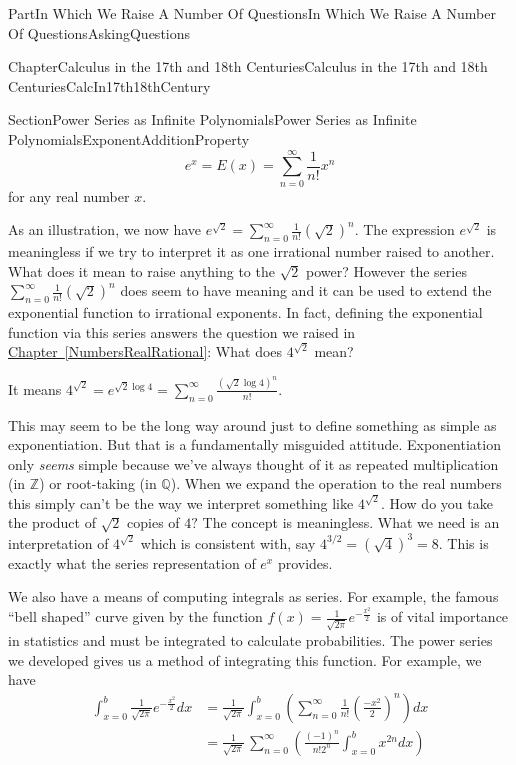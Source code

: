 \documentclass[oneside,10pt,]{book}
\newcommand{\xreffont}{\relax}
\numberwithin{equation}{part}
\newcommand{\QQ}{\mathbb {Q}}
\newcommand{\ZZ}{\mathbb {Z}}
\newcommand{\amp}{&}
\begin{document}
\begin{partptx}{Part}{In Which We Raise A Number Of Questions}{}{In Which We Raise A Number Of Questions}{}{}{AskingQuestions}
\begin{chapterptx}{Chapter}{Calculus in the 17th and 18th Centuries}{}{Calculus in the 17th and 18th Centuries}{}{}{CalcIn17th18thCentury}
\begin{sectionptx}{Section}{Power Series as Infinite Polynomials}{}{Power Series as Infinite Polynomials}{}{}{ExponentAdditionProperty}
\begin{equation*}
e^x=E(x)=\sum_{n=0}^\infty\frac{1}{n!}x^n
\end{equation*}
for any real number \(x\).%
\par
As an illustration, we now have \(e^{\sqrt{2}}=\sum_{n=0}^\infty\frac{1}{n!}\left(\sqrt{2}\right)^n\). The expression \(e^{\sqrt{2}}\) is meaningless if we try to interpret it as one irrational number raised to another. What does it mean to raise anything to the \(\sqrt{2}\) power?  However the series \(\sum_{n=0}^\infty\frac{1}{n!}\left(\sqrt{2}\right)^n\) does seem to have meaning and it can be used to extend the exponential function to irrational exponents.  In fact, defining the exponential function via this series answers the question we raised in \hyperref[NumbersRealRational]{Chapter~{\xreffont\ref{NumbersRealRational}}}: What does \(4^{\sqrt{2}}\) mean?%
\par
It means \(\displaystyle 4^{\sqrt{2}} = e^{\sqrt{2}\log 4}
= \sum_{n=0}^\infty\frac{(\sqrt{2}\log 4)^n}{n!}\).%
\par
This may seem to be the long way around just to define something as simple as exponentiation.  But that is a fundamentally misguided attitude.  Exponentiation only \emph{seems} simple because we've always thought of it as repeated multiplication (in \(\ZZ\)) or root-taking (in \(\QQ\)).  When we expand the operation to the real numbers this simply can't be the way we interpret something like \(4^{\sqrt{2}}\).  How do you take the product of \(\sqrt{2}\) copies of \(4?\) The concept is meaningless.  What we need is an interpretation of \(4^{\sqrt{2}}\) which is consistent with, say \(4^{3/2}
= \left(\sqrt{4}\right)^3=8\).  This is exactly what the series representation of \(e^x\) provides.%
\par
We also have a means of computing integrals as series.  For example, the famous ``bell shaped'' curve given by the function \(f(x)=\frac{1}{\sqrt{2\pi}}e^{-\frac{x^2}{2}}\) is of vital importance in statistics and must be integrated to calculate probabilities.  The power series we developed gives us a method of integrating this function.  For example, we have%
\begin{align*}
\int_{x=0}^b\frac{1}{\sqrt{2\pi}}e^{-\frac{x^2}{2}}d x \amp  =\frac{1}{\sqrt{2\pi}}\int_{x=0}^b\left(\sum_{n=0}^\infty\frac{1}{n!}\left(\frac{-x^2}{2}\right)^n\right)d x\\
\amp =\frac{1}{\sqrt{2\pi}}\,\sum_{n=0}^\infty\left(\frac{\left(-1\right)^n}{n!2^n}\int_{x=0}^bx^{2n}d x\right)\\

\end{align*}
\end{sectionptx}
\end{chapterptx}
\end{partptx}
\end{document}
